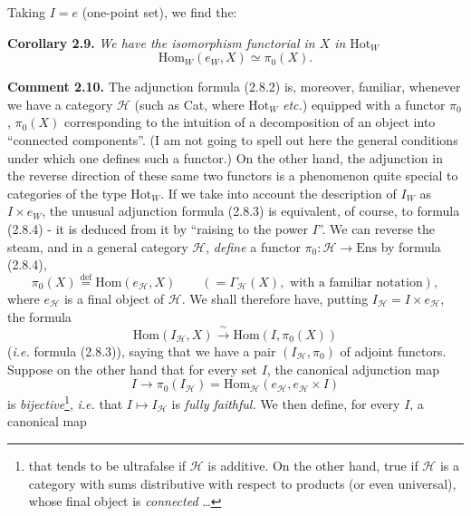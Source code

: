 Taking $I = e$ (one-point set), we find the:

\textbf{Corollary 2.9.} \textit{We have the isomorphism functorial in $X$ in} $\mathrm{Hot}_W$
\[
\boxed{\mathrm{Hom}_W(e_W, X) \simeq \pi_0(X).} \tag*{(2.8.4)}
\]

\textbf{Comment 2.10.} The adjunction formula (2.8.2) is, moreover, familiar, whenever we have a category $\mathcal{H}$ (such as Cat, where $\mathrm{Hot}_W$ \textit{etc.}) %
equipped with a functor $\pi_0$, $\pi_0(X)$ corresponding to the intuition of a decomposition of an object into ``connected components''. (I am not going to spell out here the general conditions under which one defines such a functor.) On the other hand, the adjunction in the reverse direction of these same two functors is a phenomenon quite special to categories of the type $\mathrm{Hot}_W$. If we take into account the description of $I_W$ as $I \times e_W$, the unusual adjunction formula (2.8.3) is equivalent, of course, to formula (2.8.4) - it is deduced from it by ``raising to the power $I$''. We can reverse the steam, and in a general category $\mathcal{H}$, \textit{define} a functor $\pi_0 : \mathcal{H} \longrightarrow \mathrm{Ens}$ by formula (2.8.4), %
\[
\pi_0(X) \overset{\text{def}}{=} \mathrm{Hom}(e_{\mathcal{H}}, X) \qquad (= \Gamma_{\mathcal{H}}(X), \text{ with a familiar notation}),
\]
where $e_{\mathcal{H}}$ is a final object of $\mathcal{H}$. We shall therefore have, putting $I_{\mathcal{H}} = I \times e_{\mathcal{H}}$, the formula
\[
\mathrm{Hom}(I_{\mathcal{H}}, X) \xrightarrow{\ \sim\ } \mathrm{Hom}(I, \pi_0(X))
\]
(\textit{i.e.} formula (2.8.3)), saying that we have a pair $(I_{\mathcal{H}}, \pi_0)$ of adjoint functors. Suppose on the other hand that for every set $I$, the canonical adjunction map
\[
I \longrightarrow \pi_0(I_{\mathcal{H}}) = \mathrm{Hom}_{\mathcal{H}}(e_{\mathcal{H}}, e_{\mathcal{H}} \times I)
\]
is \textit{bijective}\footnote{that tends to be ultrafalse if $\mathcal{H}$ is additive. On the other hand, true if $\mathcal{H}$ is a category with sums distributive with respect to products (or even universal), whose final object is \textit{connected} \ldots}, \textit{i.e.} that $I \longmapsto I_{\mathcal{H}}$ is \textit{fully faithful.} We then define, for every $I$, a canonical map
